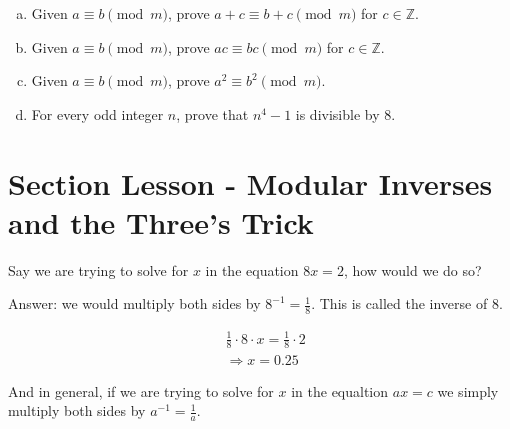 \documentclass[12pt,letterpaper]{article}
\begin{document}
	\begin{enumerate}[a.]
		\item Given $a \equiv b \pmod{m}$, prove $a + c\equiv b + c\pmod{m}$ for $c \in \mathbb{Z}$.

		\begin{mdframed}
		\vspace{2.8cm}
		\end{mdframed}


		\item Given $a \equiv b \pmod{m}$, prove $ac\equiv bc\pmod{m}$ for $c \in \mathbb{Z}$.


		\begin{mdframed}
		\vspace{4cm}
		\end{mdframed}

		\item Given $a \equiv b \pmod{m}$, prove $a^2\equiv b^2\pmod{m}$.

		\begin{mdframed}
		\vspace{5cm}
		\end{mdframed}


		\item For every odd integer $n$, prove that $n^4 -1$ is divisible by 8.
		
		\begin{mdframed}
		\vspace{5cm}
		\end{mdframed}
	\end{enumerate}

	\section*{Section Lesson - Modular Inverses and the Three's Trick}

	Say we are trying to solve for $x$ in the equation $8x = 2$, how would we do so?

	Answer: we would multiply both sides by $8^{-1} = \frac{1}{8}$. This is called the inverse of 8.
	
	\begin{align*}
		&\frac{1}{8}\cdot 8 \cdot x  = \frac{1}{8} \cdot 2 \\
		&\Rightarrow x = 0.25
	\end{align*}	

	And in general, if we are trying to solve for $x$ in the equaltion $ax = c$ we simply multiply both sides by $a^{-1} = \frac{1}{a}$. 
\end{document}
